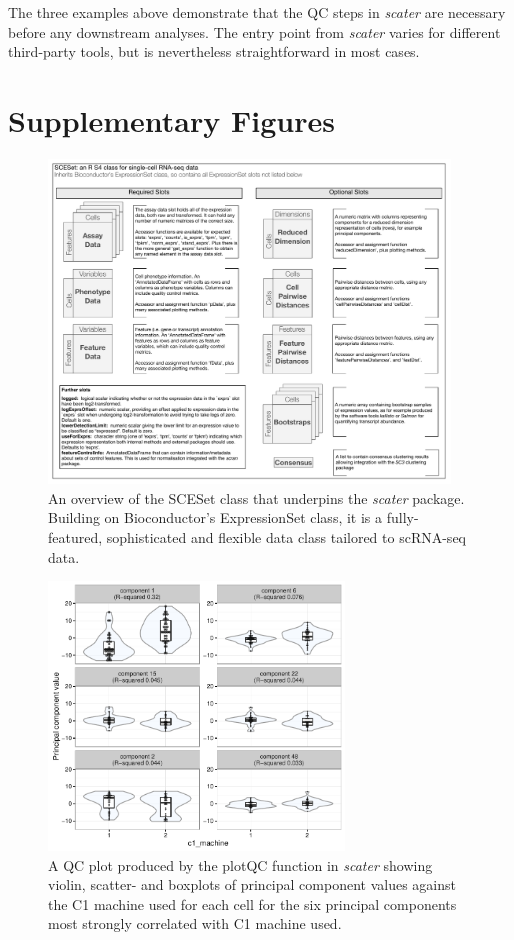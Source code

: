 \documentclass{revtex4}
\begin{document}
The three examples above demonstrate that the QC steps in \emph{scater} are necessary before any downstream analyses. The entry point from \emph{scater} varies for different third-party tools, but is nevertheless straightforward in most cases.


\section*{Supplementary Figures}


\begin{figure}[!tpb]%
\centerline{\includegraphics[width=0.95\textwidth]{figures/sceset_outline.pdf}}
\caption{An overview of the SCESet class that underpins the \emph{scater} package. Building on Bioconductor's ExpressionSet class, it is a fully-featured, sophisticated and flexible data class tailored to scRNA-seq data.}\label{fig:02}
\end{figure}


\begin{figure}[!tpb]
\centerline{\includegraphics[width=0.7\textwidth]{figures/find-pcs_c1_machine.pdf}}
\caption{A QC plot produced by the plotQC function in \emph{scater} showing violin, scatter- and boxplots of principal component values against the C1 machine used for each cell for the six principal components most strongly correlated with C1 machine used.}\label{fig:plotqc-c1-machine}
\end{figure}
\end{document}
